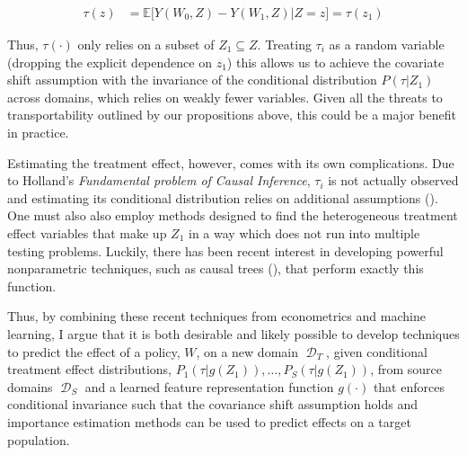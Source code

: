 \documentclass[a4paper,12pt]{article}
\DeclareMathOperator*{\D}{\mathcal{D}}
\begin{document}
\begin{align*}
\tau(z) &= \mathbb{E} \big[ Y(W_0, Z) - Y(W_1, Z) | Z = z \big] = \tau(z_1)
\end{align*}

Thus, $\tau(\cdot)$ only relies on a subset of $Z_1 \subseteq Z$. Treating $\tau_i$ as a random variable (dropping the explicit dependence on $z_1$) this allows us to achieve the covariate shift assumption with the invariance of the conditional distribution $P(\tau | Z_1)$ across domains, which relies on weakly fewer variables. Given all the threats to transportability outlined by our propositions above, this could be a major benefit in practice.

Estimating the treatment effect, however, comes with its own complications. Due to Holland's \parencite*{Holland1986} \textit{Fundamental problem of Causal Inference}, $\tau_i$ is not actually observed and estimating its conditional distribution relies on additional assumptions (\cite{Firpo2007}). One must also also employ methods designed to find the heterogeneous treatment effect variables that make up $Z_1$ in a way which does not run into multiple testing problems. Luckily, there has been recent interest in developing powerful nonparametric techniques, such as causal trees (\cite{Athey2016}), that perform exactly this function.

Thus, by combining these recent techniques from econometrics and machine learning, I argue that it is both desirable and likely possible to develop techniques to predict the effect of a policy, $W$, on a new domain $\D_T$, given conditional treatment effect distributions, $P_1(\tau | g(Z_1)),\ldots, P_S(\tau | g(Z_1))$, from source domains $\D_S$ and a learned feature representation function $g(\cdot)$ that enforces conditional invariance such that the covariance shift assumption holds and importance estimation methods can be used to predict effects on a target population.








\end{document}
